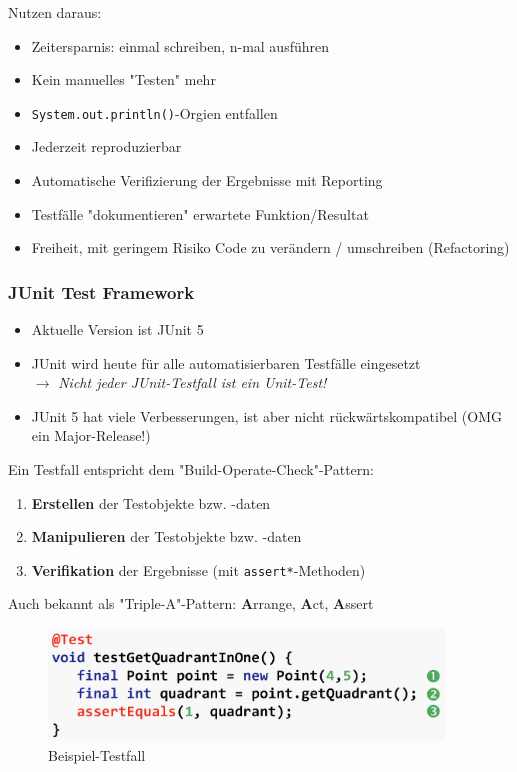 \documentclass[a4paper]{article}
\begin{document}
			Nutzen daraus:
			\begin{itemize}
				\item Zeitersparnis: einmal schreiben, n-mal ausführen
				\item Kein manuelles "Testen" mehr
				\item \texttt{System.out.println()}-Orgien entfallen
				\item Jederzeit reproduzierbar
				\item Automatische Verifizierung der Ergebnisse mit Reporting
				\item Testfälle "dokumentieren" erwartete Funktion/Resultat
				\item Freiheit, mit geringem Risiko Code zu verändern / umschreiben (Refactoring)
			\end{itemize}
		
			\subsubsection{JUnit Test Framework}
			
			\begin{itemize}
				\item Aktuelle Version ist JUnit 5
				
				\item JUnit wird heute für alle automatisierbaren Testfälle eingesetzt\\
						$\rightarrow$ \textit{Nicht jeder JUnit-Testfall ist ein Unit-Test!}
						
				\item JUnit 5 hat viele Verbesserungen, ist aber nicht rückwärtskompatibel (OMG ein Major-Release!)
			\end{itemize}
			\noindent
			Ein Testfall entspricht dem "Build-Operate-Check"-Pattern:
			\begin{enumerate}
				\item \textbf{Erstellen} der Testobjekte bzw. -daten
				\item \textbf{Manipulieren} der Testobjekte bzw. -daten
				\item \textbf{Verifikation} der Ergebnisse (mit \texttt{assert*}-Methoden)
			\end{enumerate}
			\vspace{1em}
			\noindent
			Auch bekannt als "Triple-A"-Pattern: \textbf{A}rrange, \textbf{A}ct, \textbf{A}ssert
			\begin{figure}[!htb]
				\centering
				\includegraphics[keepaspectratio, height=3cm]{img/testing/test_01.png}
				\caption{Beispiel-Testfall}
				\label{fig:test_01}
			\end{figure}
		
\end{document}

